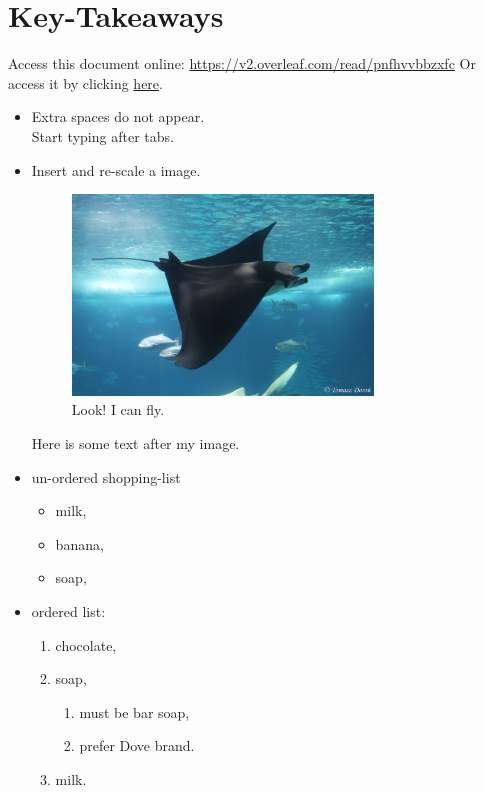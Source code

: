 \section{Key-Takeaways}

Access this document online: \url{https://v2.overleaf.com/read/pnfhvvbbzxfc}
Or access it by clicking \href{https://v2.overleaf.com/read/pnfhvvbbzxfc}{here}.

\begin{itemize}
    \item Extra spaces      do not appear. \\
        Start typing after tabs.
    \item Insert and re-scale a image.

        \begin{figure}[ht] %
        \centering
        \includegraphics[width=8cm,height=5 cm]{DevilRay.JPG} %
        \caption{Look! I can fly.}
        \label{fig:my_DevilRay}
        \end{figure}

        Here is some text after my image.
    \item un-ordered shopping-list

        \begin{itemize}
            \item milk,
            \item banana,
            \item soap,
        \end{itemize}  
    
    \item ordered list:
        \begin{enumerate}
            \item chocolate,
            \item soap,
                \begin{enumerate}
                    \item must be bar soap,
                    \item prefer Dove brand.
                \end{enumerate}
            \item milk.
    \end{enumerate}
    

\end{itemize}
